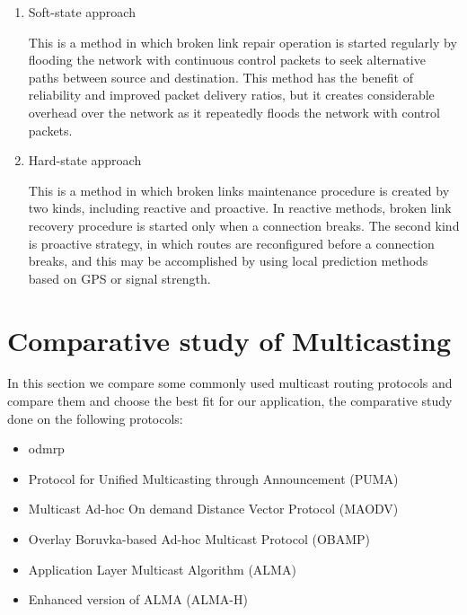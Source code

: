 \begin{enumerate}
\item Soft-state approach

This is a method in which broken link repair operation is started regularly by flooding the network with continuous control packets to seek alternative paths between source and destination. This method has the benefit of reliability and improved packet delivery ratios, but it creates considerable overhead over the network as it repeatedly floods the network with control packets. 

\item Hard-state approach

This is a method in which broken links maintenance procedure is created by two kinds, including reactive and proactive. In reactive methods, broken link recovery procedure is started only when a connection breaks. The second kind is proactive strategy, in which routes are reconfigured before a connection breaks, and this may be accomplished by using local prediction methods based on GPS or signal strength. 

\end{enumerate}

\section{Comparative study of Multicasting}
In this section we compare some commonly used multicast routing protocols and compare them and choose the best fit for our application, the comparative study done on the following protocols:
\begin{itemize}[itemsep=1pt, topsep=5pt]
    \item \acrfull{odmrp}
    \item Protocol for Unified Multicasting through Announcement (PUMA)
    \item Multicast Ad-hoc On demand Distance Vector Protocol (MAODV)
    \item Overlay Boruvka-based Ad-hoc Multicast Protocol (OBAMP)
    \item Application Layer Multicast Algorithm (ALMA)
    \item Enhanced version of ALMA (ALMA-H)
\end{itemize}

